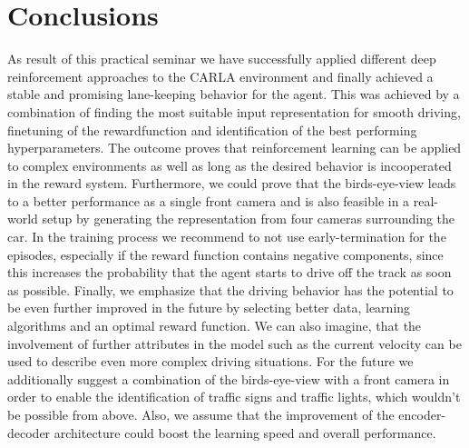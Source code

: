 \documentclass[letterpaper, 10 pt, conference]{ieeeconf}  %
\begin{document}
\section{Conclusions}
As result of this practical seminar we have successfully applied different deep reinforcement 
approaches to the CARLA environment and finally achieved a stable and promising lane-keeping behavior 
for the agent. This was achieved by a combination of finding the most suitable input representation for 
smooth driving, finetuning of the rewardfunction and identification of the best performing hyperparameters. 
The outcome proves that reinforcement learning can be applied to complex environments as well as long as the 
desired behavior is incooperated in the reward system. Furthermore, we could prove that the birds-eye-view leads 
to a better performance as a single front camera and is also feasible in a real-world setup by generating the 
representation from four cameras surrounding the car. In the training process we recommend to not use early-termination 
for the episodes, especially if the reward function contains negative components, since this increases the probability that 
the agent starts to drive off the track as soon as possible. Finally, we emphasize that the driving behavior has the potential 
to be even further improved in the future by selecting better data, learning algorithms and an optimal reward function. 
We can also imagine, that the involvement of further attributes in the model such as the current velocity can be used 
to describe even more complex driving situations.  \newline
For the future we additionally suggest a combination of the birds-eye-view with a front camera 
in order to enable the identification of traffic signs and traffic lights, which wouldn't be 
possible from above. Also, we assume that the improvement of the encoder-decoder 
architecture could boost the learning speed and overall performance.



\addtolength{\textheight}{-12cm}   %
\end{document}
